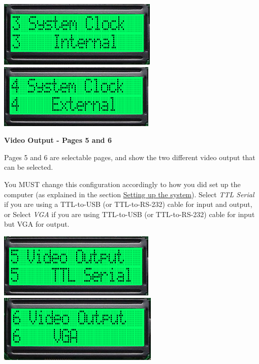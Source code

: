         \begin{center}
            \includegraphics[scale=0.7]{images/dastaZ80_ControlPanel_Page3.png}
            \includegraphics[scale=0.7]{images/dastaZ80_ControlPanel_Page4.png}
        \end{center}

        \textbf{Video Output - Pages 5 and 6}

        Pages 5 and 6 are selectable pages, and show the two different video
        output that can be selected.

        You MUST change this configuration accordingly to how you did set up the
        computer (as explained in the section \hyperref[sec:setting_system]
        {Setting up the system}). Select \textit{TTL Serial} if you are using
        a TTL-to-USB (or TTL-to-RS-232) cable for input and output, or Select 
        \textit{VGA} if you are using TTL-to-USB (or TTL-to-RS-232) cable for
        input but VGA for output.

        \begin{center}
            \includegraphics[scale=0.7]{images/dastaZ80_ControlPanel_Page5.png}
            \includegraphics[scale=0.7]{images/dastaZ80_ControlPanel_Page6.png}
        \end{center}

